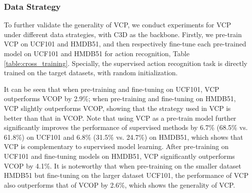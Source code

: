 \documentclass[letterpaper]{article}
\begin{document}
\begin{table}
\caption{Performance (average on all test splits) comparison under different data strategies. UCF101 (HMDB51) dentoes the model is pre-trained on HMDB51 and fine-tuned on UCF101.}
    \label{table:cross_training}
\end{table}

\subsubsection{Data Strategy}
To further validate the generality of VCP, we conduct experiments for VCP under different data strategies, with C3D as the backbone. Firstly, we pre-train VCP on UCF101 and HMDB51, and then respectively fine-tune each pre-trained model on UCF101 and HMDB51 for action recognition, Table \ref{table:cross_training}. Specially, the supervised action recognition task is directly trained on the target datasets, with random initialization.

It can be seen that when pre-training and fine-tuning on UCF101, VCP outperforms VCOP by 2.9\%; when pre-training and fine-tuning on HMDB51, VCP slightly outperforms VCOP, showing that the strategy used in VCP is better than that in VCOP. Note that using VCP as a pre-train model further significantly improves the performance of supervised methods by 6.7\% (68.5\% vs. 61.8\%) on UCF101 and 6.8\% (31.5\% vs. 24.7\%) on HMDB51, which shows that VCP is complementary to supervised model learning. After pre-training on UCF101 and fine-tuning models on HMDB51, VCP significantly outperforms VCOP by 4.1\%. It is noteworthy that when pre-training on the smaller dataset HMDB51 but fine-tuning on the larger dataset UCF101, the performance of VCP also outperforms that of VCOP by 2.6\%, which shows the generality of VCP.
\end{document}
